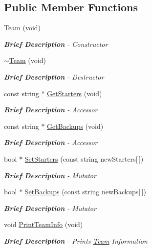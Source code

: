 \subsection*{Public Member Functions}
\begin{DoxyCompactItemize}
\item 
\hyperlink{class_team_a5c50ce3e6092301c0fa990d924b3827f}{Team} (void)
\begin{DoxyCompactList}\small\item\em {\bfseries Brief Description} -\/ Constructor \end{DoxyCompactList}\item 
\hyperlink{class_team_ad0b24ef1a01a350f03517022070f4d74}{$\sim$\-Team} (void)
\begin{DoxyCompactList}\small\item\em {\bfseries Brief Description} -\/ Destructor \end{DoxyCompactList}\item 
const string $\ast$ \hyperlink{class_team_a18cb95e82e37488b41d3dd001431e8ec}{Get\-Starters} (void)
\begin{DoxyCompactList}\small\item\em {\bfseries Brief Description} -\/ Accessor \end{DoxyCompactList}\item 
const string $\ast$ \hyperlink{class_team_a5b802edf160b74d7428d3ee744d847fb}{Get\-Backups} (void)
\begin{DoxyCompactList}\small\item\em {\bfseries Brief Description} -\/ Accessor \end{DoxyCompactList}\item 
bool $\ast$ \hyperlink{class_team_af808fa3ac89d09c75019f0119f2a7ee1}{Set\-Starters} (const string new\-Starters\mbox{[}$\,$\mbox{]})
\begin{DoxyCompactList}\small\item\em {\bfseries Brief Description} -\/ Mutator \end{DoxyCompactList}\item 
bool $\ast$ \hyperlink{class_team_a74a3662a1280c55934675fa6685c8886}{Set\-Backups} (const string new\-Backups\mbox{[}$\,$\mbox{]})
\begin{DoxyCompactList}\small\item\em {\bfseries Brief Description} -\/ Mutator \end{DoxyCompactList}\item 
void \hyperlink{class_team_a1132a80759e3fcfce0b69d1c8c156016}{Print\-Team\-Info} (void)
\begin{DoxyCompactList}\small\item\em {\bfseries Brief Description} -\/ Prints \hyperlink{class_team}{Team} Information \end{DoxyCompactList}\end{DoxyCompactItemize}
